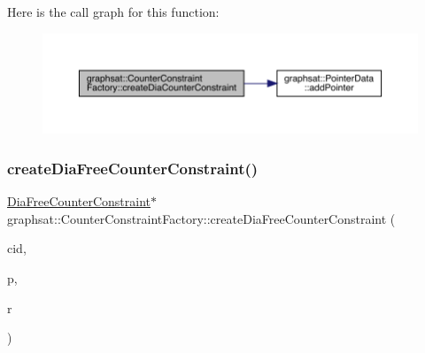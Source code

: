 Here is the call graph for this function\+:\nopagebreak
\begin{figure}[H]
\begin{center}
\leavevmode
\includegraphics[width=350pt]{classgraphsat_1_1_counter_constraint_factory_ade0ff0c1aca8de0e07be8fc7f0694996_cgraph}
\end{center}
\end{figure}
\mbox{\label{classgraphsat_1_1_counter_constraint_factory_aca06d5896ce73cd048aadc97feea88f7}} 
\subsubsection{\texorpdfstring{createDiaFreeCounterConstraint()}{createDiaFreeCounterConstraint()}}
{\footnotesize\ttfamily \mbox{\hyperlink{classgraphsat_1_1_dia_free_counter_constraint}{Dia\+Free\+Counter\+Constraint}}$\ast$ graphsat\+::\+Counter\+Constraint\+Factory\+::create\+Dia\+Free\+Counter\+Constraint (\begin{DoxyParamCaption}\item[{int}]{cid,  }\item[{\mbox{\hyperlink{namespacegraphsat_acfb5939f9bdafbd9aea0d084b9a56f69}{C\+O\+M\+P\+\_\+\+O\+P\+E\+R\+A\+T\+OR}}}]{p,  }\item[{int}]{r }\end{DoxyParamCaption})\hspace{0.3cm}{\ttfamily [inline]}}

